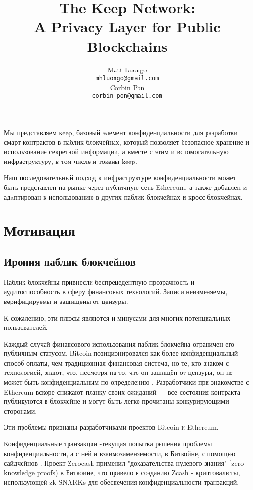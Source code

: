 \documentclass[english,russian,11pt]{article}
\title{The Keep Network:\protect\\A Privacy Layer for Public Blockchains}
\author{Matt Luongo \\
  {\tt mhluongo@gmail.com} \\\And
  Corbin Pon \\
  {\tt corbin.pon@gmail.com} \\}
\date{}
\begin{document}
\thispagestyle{fancy}

\maketitle

\begin{Резюме}

  Мы представляем кeep, базовый элемент конфиденциальности 
  для разработки смарт-контрактов в паблик блокчейнах, который 
  позволяет безопасное хранение и использование секретной 
  информации, а вместе с этим и вспомогательную  инфраструктуру, 
  в том числе и токены keep.

  Наш последовательный подход к инфраструктуре конфиденциальности 
  может быть представлен на рынке через публичную сеть Ethereum, 
  а также добавлен и адaптирован к использованию в других 
  паблик блокчейнах и кросс-блокчейнах.

\end{Резюме}

\section{Мотивация}

\subsection{Ирония паблик блокчейнов}

Паблик блокчейны привнесли беспрецедентную прозрачность и 
аудитоспособность в сферу финансовых технологий. 
Записи неизменяемы, верифицируемы и защищены от цензуры.

К сожалению, эти плюсы являются и минусами для многих потенциальных 
пользователей. 

Каждый  случай финансового использования паблик блокчейна ограничен 
его публичным статусом. Bitcoin позиционировался как более 
конфиденциальный способ оплаты, чем традиционная финансовая система, 
но те, кто знаком с технологией, знают, что, несмотря на то, что 
он защищён от цензуры, он не может быть конфиденциальным по 
определению \cite{bitcoinPrivacy}. Разработчики при знакомстве с 
Ethereum вскоре снижают планку своих ожиданий \cite{ethereumStackexchange}— 
все состояния контракта публикуются в блокчейне и могут быть легко 
прочитаны конкурирующими сторонами.

Эти проблемы признаны разработчиками проектов Bitcoin и Ethereum.

Конфиденциальные транзакции \cite{confidentialTransactions}-текущая 
попытка решения проблемы конфиденциальности, а с ней и 
взаимозаменяемости, в Биткойне, с помощью сайдчейнов \cite{confidentialTransactionsElements}. 
Проект Zerocash \cite{zerocash} применил "доказательства нулевого 
знания" (zero-knowledge proofs) в Биткоине, что привело к созданию 
Zcash \cite{zcash}- криптовалюты, использующей zk-SNARKs для 
обеспечения конфиденциальности транзакций.
\end{document}
